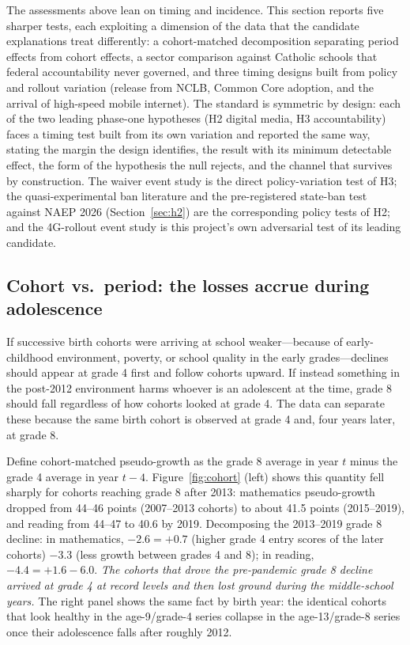 \documentclass[11pt]{article}
\begin{document}
The assessments above lean on timing and incidence. This section reports five sharper tests, each exploiting a dimension of the data that the candidate explanations treat differently: a cohort-matched decomposition separating period effects from cohort effects, a sector comparison against Catholic schools that federal accountability never governed, and three timing designs built from policy and rollout variation (release from NCLB, Common Core adoption, and the arrival of high-speed mobile internet). The standard is symmetric by design: each of the two leading phase-one hypotheses (H2 digital media, H3 accountability) faces a timing test built from its own variation and reported the same way, stating the margin the design identifies, the result with its minimum detectable effect, the form of the hypothesis the null rejects, and the channel that survives by construction. The waiver event study is the direct policy-variation test of H3; the quasi-experimental ban literature and the pre-registered state-ban test against NAEP 2026 (Section~\ref{sec:h2}) are the corresponding policy tests of H2; and the 4G-rollout event study is this project's own adversarial test of its leading candidate.

\subsection{Cohort vs.\ period: the losses accrue during adolescence}
\label{sec:cohort}

If successive birth cohorts were arriving at school weaker---because of early-childhood environment, poverty, or school quality in the early grades---declines should appear at grade 4 first and follow cohorts upward. If instead something in the post-2012 environment harms whoever is an adolescent at the time, grade 8 should fall regardless of how cohorts looked at grade 4. The data can separate these because the same birth cohort is observed at grade 4 and, four years later, at grade 8.

Define cohort-matched pseudo-growth as the grade 8 average in year $t$ minus the grade 4 average in year $t-4$. Figure~\ref{fig:cohort} (left) shows this quantity fell sharply for cohorts reaching grade 8 after 2013: mathematics pseudo-growth dropped from 44--46 points (2007--2013 cohorts) to about 41.5 points (2015--2019), and reading from 44--47 to 40.6 by 2019. Decomposing the 2013--2019 grade 8 decline: in mathematics, $-2.6 = +0.7$ (higher grade 4 entry scores of the later cohorts) $-3.3$ (less growth between grades 4 and 8); in reading, $-4.4 = +1.6 - 6.0$. \emph{The cohorts that drove the pre-pandemic grade 8 decline arrived at grade 4 at record levels and then lost ground during the middle-school years.} The right panel shows the same fact by birth year: the identical cohorts that look healthy in the age-9/grade-4 series collapse in the age-13/grade-8 series once their adolescence falls after roughly 2012.
\end{document}
